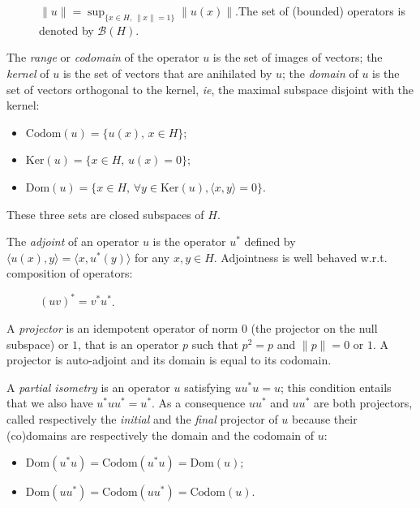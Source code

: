 \begin{description}
\item[]
\(\|u\| = \sup_{\{x\in H,\, \|x\| = 1\}}\|u(x)\|\).The set of (bounded)
operators is denoted by \(\mathcal{B}(H)\).
\end{description}

The \emph{range} or \emph{codomain} of the operator \(u\) is the set of
images of vectors; the \emph{kernel} of \(u\) is the set of vectors that
are anihilated by \(u\); the \emph{domain} of \(u\) is the set of
vectors orthogonal to the kernel, \emph{ie}, the maximal subspace
disjoint with the kernel:
\begin{itemize}
\item \(\mathrm{Codom}(u) = \{u(x),\, x\in H\}\);
\item \(\mathrm{Ker}(u) = \{x\in H,\, u(x) = 0\}\);
\item \(\mathrm{Dom}(u) = \{x\in H,\, \forall y\in\mathrm{Ker}(u), \langle x, y\rangle = 0\}\).
\end{itemize}

These three sets are closed subspaces of \(H\).

The \emph{adjoint} of an operator \(u\) is the operator \(u^*\) defined
by \(\langle u(x), y\rangle = \langle x, u^*(y)\rangle\) for any
\(x,y\in H\). Adjointness is well behaved w.r.t. composition of
operators:

\begin{description}
\item[]
\((uv)^* = v^*u^*\).
\end{description}

A \emph{projector} is an idempotent operator of norm \(0\) (the
projector on the null subspace) or \(1\), that is an operator \(p\) such
that \(p^2 = p\) and \(\|p\| = 0\) or \(1\). A projector is auto-adjoint
and its domain is equal to its codomain.

A \emph{partial isometry} is an operator \(u\) satisfying \(uu^* u =
u\); this condition entails that we also have \(u^*uu^* =
u^*\). As a consequence \(uu^*\) and \(uu^*\) are both projectors,
called respectively the \emph{initial} and the \emph{final} projector of
\(u\) because their (co)domains are respectively the domain and the
codomain of \(u\):
\begin{itemize}
\item \(\mathrm{Dom}(u^*u) = \mathrm{Codom}(u^*u) = \mathrm{Dom}(u)\);
\item \(\mathrm{Dom}(uu^*) = \mathrm{Codom}(uu^*) = \mathrm{Codom}(u)\).
\end{itemize}

